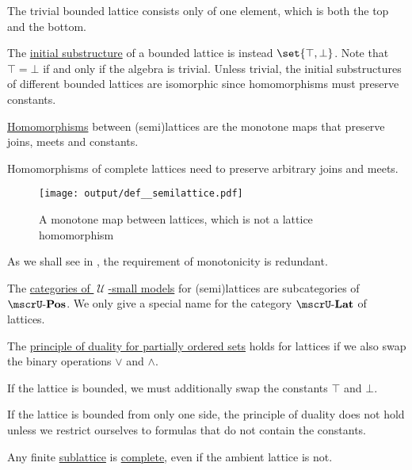 \begin{definition}
\begin{thmenum}[resume=def:semilattice]
    The trivial bounded lattice consists only of one element, which is both the top and the bottom.

    The \hyperref[thm:substructures_form_complete_lattice/bottom]{initial substructure} of a bounded lattice is instead \( \set{ \top, \bot } \). Note that \( \top = \bot \) if and only if the algebra is trivial. Unless trivial, the initial substructures of different bounded lattices are isomorphic since homomorphisms must preserve constants.

     \hyperref[def:first_order_homomorphism]{Homomorphisms} between (semi)lattices are the monotone maps that preserve joins, meets and constants.

    Homomorphisms of complete lattices need to preserve arbitrary joins and meets.

    \begin{figure}[!ht]
      \centering
      \texttt{[image: output/def\_\_semilattice.pdf]}
      \caption{A monotone map between lattices, which is not a lattice homomorphism}
      \label{fig:def:semilattice/homomorphism/monotone_map_not_homomorphism}
    \end{figure}

    As we shall see in , the requirement of monotonicity is redundant.

     The \hyperref[def:category_of_small_first_order_models]{categories of \( \mscrU \)-small models} for (semi)lattices are subcategories of \hyperref[def:partially_ordered_set/category]{\( \ucat{Pos} \)}. We only give a special name for the category \( \ucat{Lat} \) of lattices.

     The \hyperref[def:partially_ordered_set/duality]{principle of duality for partially ordered sets} holds for lattices if we also swap the binary operations \( \vee \) and \( \wedge \).

    If the lattice is bounded, we must additionally swap the constants \( \top \) and \( \bot \).

    If the lattice is bounded from only one side, the principle of duality does not hold unless we restrict ourselves to formulas that do not contain the constants.
  \end{thmenum}
\end{definition}

\begin{example}\label{ex:complete_sublattice_of_incomplete_lattice}
  Any finite \hyperref[def:semilattice/submodel]{sublattice} is \hyperref[def:semilattice/complete]{complete}, even if the ambient lattice is not.
\end{example}

